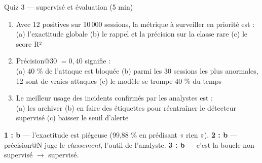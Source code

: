 \begin{frame}{Quiz 3 --- supervisé et évaluation (5 min)}
\begin{qbox}[3 questions]
\begin{enumerate}
\item Avec 12 positives sur 10\,000 sessions, la métrique à surveiller en
priorité est :\\
(a) l'exactitude globale \quad (b) le rappel et la précision sur la classe
rare \quad (c) le score R²
\item Précision@30 $= 0{,}40$ signifie :\\
(a) 40 \% de l'attaque est bloquée \quad (b) parmi les 30 sessions les plus
anormales, 12 sont de vraies attaques \quad (c) le modèle se trompe 40 \% du temps
\item Le meilleur usage des incidents confirmés par les analystes est :\\
(a) les archiver \quad (b) en faire des étiquettes pour réentraîner le
détecteur supervisé \quad (c) baisser le seuil d'alerte
\end{enumerate}
\end{qbox}
\vspace{1mm}
\begin{solbox}[Réponses]
\textbf{1 : b} --- l'exactitude est piégeuse (99,88 \% en prédisant « rien »).
\quad
\textbf{2 : b} --- précision@N juge le \emph{classement}, l'outil de l'analyste.
\quad
\textbf{3 : b} --- c'est la boucle non supervisé $\rightarrow$ supervisé.
\end{solbox}
\end{frame}
